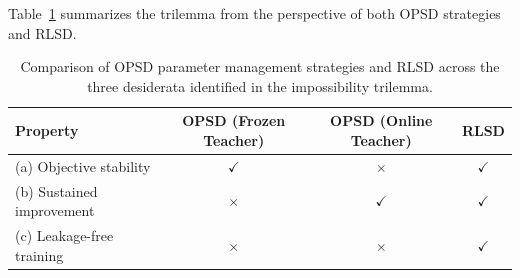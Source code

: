 \documentclass[]{jingdong}
\begin{document}
Table~\ref{tab:trilemma} summarizes the trilemma from the perspective of both OPSD strategies and RLSD.

\begin{table}[h]
\centering
\caption{Comparison of OPSD parameter management strategies and RLSD across the three desiderata identified in the impossibility trilemma.}
\label{tab:trilemma}
\small
\begin{tabular}{lccc}
\toprule
\textbf{Property} & \textbf{OPSD (Frozen Teacher)} & \textbf{OPSD (Online Teacher)} & \textbf{RLSD} \\
\midrule
(a) Objective stability & $\checkmark$ & $\times$ & $\checkmark$ \\
(b) Sustained improvement & $\times$ & $\checkmark$ & $\checkmark$ \\
(c) Leakage-free training & $\times$ & $\times$ & $\checkmark$ \\
\bottomrule
\end{tabular}
\end{table}



\newpage
% 
\end{document}
